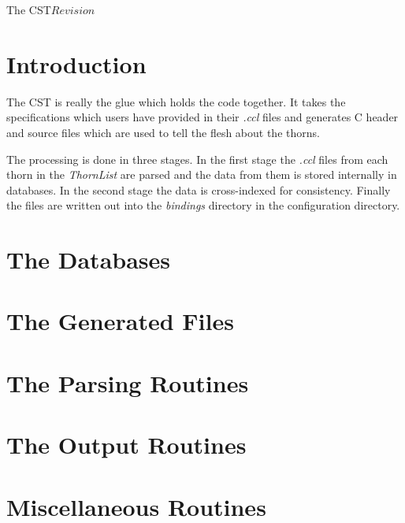 %   

\begin{cactuspart}{4}{The CST}{}{$Revision$}
\renewcommand{\thepage}{\Alph{part}\arabic{page}}

\chapter{Introduction}

The CST is really the glue which holds the code together.  It takes the 
specifications which users have provided in their {\em .ccl} files
and generates C header and source files which are used to tell the 
flesh about the thorns.

The processing is done in three stages.  In the first stage the {\em .ccl}
files from each thorn in the {\em ThornList} are parsed and the data from them
is stored internally in databases.  In the second stage the data is 
cross-indexed for consistency.  Finally the files are written out into the 
{\em bindings} directory in the configuration directory.

\chapter{The Databases}

\chapter{The Generated Files}

\chapter{The Parsing Routines}

\chapter{The Output Routines}

\chapter{Miscellaneous Routines}

\end{cactuspart}
